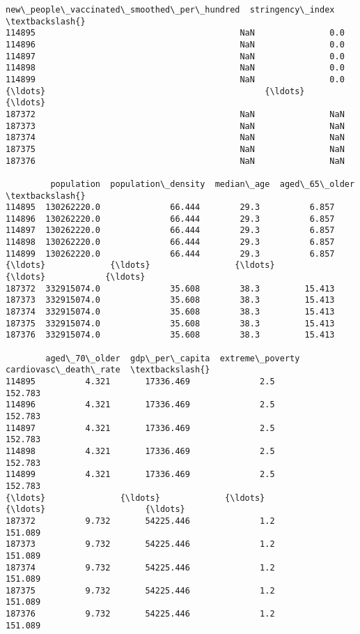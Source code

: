 \documentclass[11pt]{article}
\begin{document}
\begin{tcolorbox}[breakable, size=fbox, boxrule=.5pt, pad at break*=1mm, opacityfill=0]
\begin{Verbatim}[commandchars=\\\{\}]
        new\_people\_vaccinated\_smoothed\_per\_hundred  stringency\_index  \textbackslash{}
114895                                         NaN               0.0
114896                                         NaN               0.0
114897                                         NaN               0.0
114898                                         NaN               0.0
114899                                         NaN               0.0
{\ldots}                                            {\ldots}               {\ldots}
187372                                         NaN               NaN
187373                                         NaN               NaN
187374                                         NaN               NaN
187375                                         NaN               NaN
187376                                         NaN               NaN

         population  population\_density  median\_age  aged\_65\_older  \textbackslash{}
114895  130262220.0              66.444        29.3          6.857
114896  130262220.0              66.444        29.3          6.857
114897  130262220.0              66.444        29.3          6.857
114898  130262220.0              66.444        29.3          6.857
114899  130262220.0              66.444        29.3          6.857
{\ldots}             {\ldots}                 {\ldots}         {\ldots}            {\ldots}
187372  332915074.0              35.608        38.3         15.413
187373  332915074.0              35.608        38.3         15.413
187374  332915074.0              35.608        38.3         15.413
187375  332915074.0              35.608        38.3         15.413
187376  332915074.0              35.608        38.3         15.413

        aged\_70\_older  gdp\_per\_capita  extreme\_poverty  cardiovasc\_death\_rate  \textbackslash{}
114895          4.321       17336.469              2.5                152.783
114896          4.321       17336.469              2.5                152.783
114897          4.321       17336.469              2.5                152.783
114898          4.321       17336.469              2.5                152.783
114899          4.321       17336.469              2.5                152.783
{\ldots}               {\ldots}             {\ldots}              {\ldots}                    {\ldots}
187372          9.732       54225.446              1.2                151.089
187373          9.732       54225.446              1.2                151.089
187374          9.732       54225.446              1.2                151.089
187375          9.732       54225.446              1.2                151.089
187376          9.732       54225.446              1.2                151.089


\end{Verbatim}
\end{tcolorbox}
\end{document}
